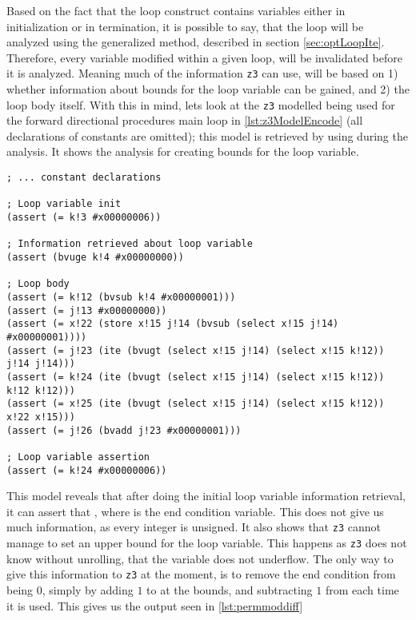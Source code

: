 Based on the fact that the loop construct contains variables either in initialization or
in termination, it is possible to say, that the loop will be analyzed using the generalized
method, described in section \ref{sec:optLoopIte}. Therefore, every variable modified within
a given loop, will be invalidated before it is analyzed. Meaning much of the information \texttt{z3}
can use, will be based on 1) whether information about bounds for the loop variable can be
gained, and 2) the loop body itself. With this in mind, lets look at the \texttt{z3} modelled
being used for the forward directional  procedures main loop in
\autoref{lst:z3ModelEncode} (all declarations of constants are omitted); this model is retrieved
by using  during the analysis. It shows the analysis for creating bounds
for the loop variable.

\begin{lstlisting}[label={lst:z3ModelEncode}]
; ... constant declarations

; Loop variable init
(assert (= k!3 #x00000006))

; Information retrieved about loop variable
(assert (bvuge k!4 #x00000000))

; Loop body
(assert (= k!12 (bvsub k!4 #x00000001)))
(assert (= j!13 #x00000000))
(assert (= x!22 (store x!15 j!14 (bvsub (select x!15 j!14) #x00000001))))
(assert (= j!23 (ite (bvugt (select x!15 j!14) (select x!15 k!12)) j!14 j!14)))
(assert (= k!24 (ite (bvugt (select x!15 j!14) (select x!15 k!12)) k!12 k!12)))
(assert (= x!25 (ite (bvugt (select x!15 j!14) (select x!15 k!12)) x!22 x!15)))
(assert (= j!26 (bvadd j!23 #x00000001)))

; Loop variable assertion
(assert (= k!24 #x00000006))
\end{lstlisting}
\noindent
This model reveals that after doing the initial loop variable information retrieval, it can
assert that , where  is the end condition
variable. This does not give us much information, as every integer is unsigned. It also shows that
\texttt{z3} cannot manage to set an upper bound for the loop variable. This happens as
\texttt{z3} does not know without unrolling, that the variable does not underflow.
The only way to give this information to \texttt{z3} at the moment, is to remove the end condition
from being $0$, simply by adding $1$ to  at the bounds, and subtracting $1$ from 
each time it is used. This gives us the  output seen in \autoref{lst:permmoddiff}

